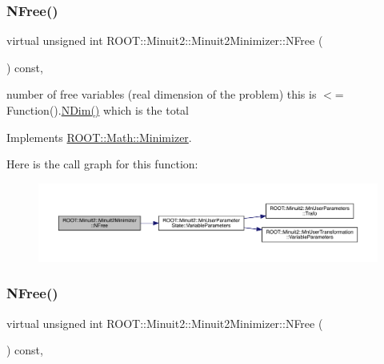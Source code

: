 \subsubsection{\texorpdfstring{NFree()}{NFree()}\hspace{0.1cm}{\footnotesize\ttfamily [1/3]}}
{\footnotesize\ttfamily virtual unsigned int R\+O\+O\+T\+::\+Minuit2\+::\+Minuit2\+Minimizer\+::\+N\+Free (\begin{DoxyParamCaption}{ }\end{DoxyParamCaption}) const\hspace{0.3cm}{\ttfamily [inline]}, {\ttfamily [virtual]}}

number of free variables (real dimension of the problem) this is $<$= Function().\mbox{\hyperlink{classROOT_1_1Minuit2_1_1Minuit2Minimizer_a6ed2c7d99296e222f0f43295e302eb9e}{N\+Dim()}} which is the total 

Implements \mbox{\hyperlink{classROOT_1_1Math_1_1Minimizer_a75a7cd8dc0d764ecc9d82dd8f83aab24}{R\+O\+O\+T\+::\+Math\+::\+Minimizer}}.

Here is the call graph for this function\+:
\nopagebreak
\begin{figure}[H]
\begin{center}
\leavevmode
\includegraphics[width=350pt]{d0/d9c/classROOT_1_1Minuit2_1_1Minuit2Minimizer_a0aa136c5a94d1e5c6bfcbfb98da7ad2d_cgraph}
\end{center}
\end{figure}
\mbox{\label{classROOT_1_1Minuit2_1_1Minuit2Minimizer_a0aa136c5a94d1e5c6bfcbfb98da7ad2d}} 
\subsubsection{\texorpdfstring{NFree()}{NFree()}\hspace{0.1cm}{\footnotesize\ttfamily [2/3]}}
{\footnotesize\ttfamily virtual unsigned int R\+O\+O\+T\+::\+Minuit2\+::\+Minuit2\+Minimizer\+::\+N\+Free (\begin{DoxyParamCaption}{ }\end{DoxyParamCaption}) const\hspace{0.3cm}{\ttfamily [inline]}, {\ttfamily [virtual]}}

